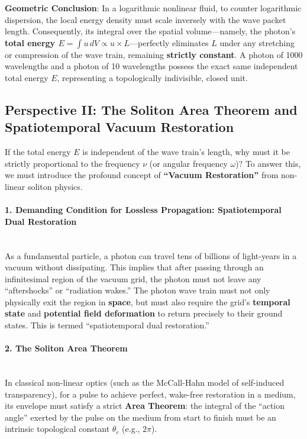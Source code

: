 \documentclass[12pt, a4paper]{article}
\begin{document}
\textbf{Geometric Conclusion}: In a logarithmic nonlinear fluid, to counter logarithmic dispersion, the local energy density must scale inversely with the wave packet length. Consequently, its integral over the spatial volume---namely, the photon's \textbf{total energy $E = \int u \, dV \propto u \times L$}---perfectly eliminates $L$ under any stretching or compression of the wave train, remaining \textbf{strictly constant}. A photon of 1000 wavelengths and a photon of 10 wavelengths possess the exact same independent total energy $E$, representing a topologically indivisible, closed unit.

\subsection{Perspective II: The Soliton Area Theorem and Spatiotemporal Vacuum Restoration}

If the total energy $E$ is independent of the wave train's length, why must it be strictly proportional to the frequency $\nu$ (or angular frequency $\omega$)? To answer this, we must introduce the profound concept of \textbf{``Vacuum Restoration''} from non-linear soliton physics.

\paragraph{1. Demanding Condition for Lossless Propagation: Spatiotemporal Dual Restoration} ~\\
As a fundamental particle, a photon can travel tens of billions of light-years in a vacuum without dissipating. This implies that after passing through an infinitesimal region of the vacuum grid, the photon must not leave any ``aftershocks'' or ``radiation wakes.'' The photon wave train must not only physically exit the region in \textbf{space}, but must also require the grid's \textbf{temporal state} and \textbf{potential field deformation} to return precisely to their ground states. This is termed ``spatiotemporal dual restoration.''

\paragraph{2. The Soliton Area Theorem} ~\\
In classical non-linear optics (such as the McCall-Hahn model of self-induced transparency), for a pulse to achieve perfect, wake-free restoration in a medium, its envelope must satisfy a strict \textbf{Area Theorem}: the integral of the ``action angle'' exerted by the pulse on the medium from start to finish must be an intrinsic topological constant $\theta_c$ (e.g., $2\pi$).
\end{document}
